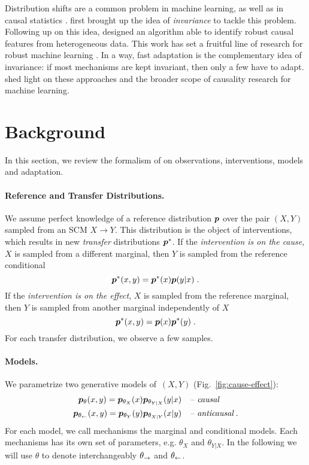 Distribution shifts are a common problem in machine learning, as well as in causal statistics \citep{zhang2013domain, pearl2014external}.
\citet{scholkopf2012causal} first brought up the idea of \emph{invariance} to tackle this problem.
Following up on this idea, \citet{peters2016causal} designed an algorithm able to identify robust causal features from heterogeneous data.
This work has set a fruitful line of research for robust machine learning \citep{heinze2018invariant, heinze2018causal, rothenhausler2019causal, arjovsky2019invariant}.
In a way, fast adaptation is the complementary idea of invariance: if most mechanisms are kept invariant, then only a few have to adapt. 
\citet{scholkopf2019causality} shed light on these approaches and the broader scope of causality research for machine learning.

\section{{Background}}

In this section, we review the formalism of \citet{bengio2019meta} on observations, interventions, models and adaptation.

\paragraph{Reference and Transfer Distributions.}
We assume perfect knowledge of a reference distribution $\bm{p}$ over the pair $(X,Y)$ sampled from an SCM $X\rightarrow Y$. This distribution is the object of interventions, which results in new \emph{transfer} distributions $\bm{p}^*$.
If the \textit{intervention is on the cause}, $X$ is sampled from a different marginal, then $Y$ is sampled from the reference conditional
\begin{equation}
    \bm{p}^*(x,y) = \bm{p}^*(x) \bm{p}(y|x) \; .
\end{equation}
If the \textit{intervention is on the effect}, $X$ is sampled from the reference marginal, then $Y$ is sampled from another marginal independently of $X$
\begin{equation}
    \bm{p}^*(x,y) = \bm{p}(x) \bm{p}^*(y) \; .
\end{equation}
For each transfer distribution, we observe a few samples. 


\paragraph{Models.} 
We parametrize two generative models of~$(X, Y)$ (Fig.~\ref{fig:cause-effect}):
\begin{align}
    \bm{p}_{\theta} (x, y) = \bm{p}_{\theta_X}(x)  \bm{p}_{\theta_{Y|X}}(y|x)  \quad 
    &\textit{-- causal} \label{eq:causal_eq}\\
    \bm{p}_{\theta_\leftarrow} (x,y) = \bm{p}_{\theta_Y}(y)  \bm{p}_{\theta_{X|Y}}(x|y) \quad 
    &\textit{-- anticausal}  \label{eq:anti_causal_eq}\; .
\end{align}
For each model, we call mechanisms the marginal and conditional models.
Each mechanisms has its own set of parameters, e.g. $\theta_X$ and $\theta_{Y|X}$.
In the following we will use $\theta$ to denote interchangeably $\theta_\rightarrow$ and $\theta_\leftarrow$.

